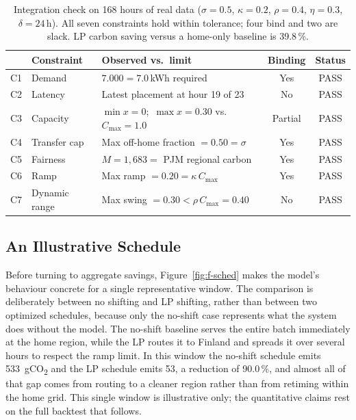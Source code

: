 \begin{table}[tbp]
\centering\small
\renewcommand{\arraystretch}{1.25}
\begin{tabularx}{\linewidth}{llXcc}
\toprule
& \textbf{Constraint} & \textbf{Observed vs.\ limit} & \textbf{Binding} & \textbf{Status} \\
\midrule
C1 & Demand        & $7.000 = 7.0$\,kWh required & Yes & PASS \\
C2 & Latency       & Latest placement at hour 19 of 23 & No & PASS \\
C3 & Capacity      & $\min x = 0$;\ $\max x = 0.30$ vs.\ $C_{\max}=1.0$ & Partial & PASS \\
C4 & Transfer cap  & Max off-home fraction $= 0.50 = \sigma$ & Yes & PASS \\
C5 & Fairness      & $M = 1{,}683 =$ PJM regional carbon & Yes & PASS \\
C6 & Ramp          & Max ramp $= 0.20 = \kappa\,C_{\max}$ & Yes & PASS \\
C7 & Dynamic range & Max swing $= 0.30 < \rho\,C_{\max} = 0.40$ & No & PASS \\
\bottomrule
\end{tabularx}
\caption{Integration check on 168 hours of real data ($\sigma=0.5$, $\kappa=0.2$, $\rho=0.4$, $\eta=0.3$, $\delta=24$\,h). All seven constraints hold within tolerance; four bind and two are slack. LP carbon saving versus a home-only baseline is 39.8\,\%.}
\label{tab:integ}
\end{table}

\FloatBarrier
\subsection{An Illustrative Schedule}
\label{sec:res-schedule}

Before turning to aggregate savings, Figure~\ref{fig:f-sched} makes the model's behaviour concrete for a single representative window. The comparison is deliberately between no shifting and LP shifting, rather than between two optimized schedules, because only the no-shift case represents what the system does without the model. The no-shift baseline serves the entire batch immediately at the home region, while the LP routes it to Finland and spreads it over several hours to respect the ramp limit. In this window the no-shift schedule emits 533~gCO\textsubscript{2} and the LP schedule emits 53, a reduction of 90.0\,\%, and almost all of that gap comes from routing to a cleaner region rather than from retiming within the home grid. This single window is illustrative only; the quantitative claims rest on the full backtest that follows.

